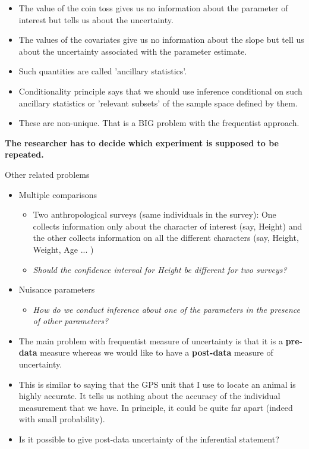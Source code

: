 \documentclass[10pt]{beamer}
\begin{document}
\begin{frame}
\begin{itemize}
\item The value of the coin toss gives us no information about the parameter of interest but tells us about the uncertainty.
\pause
\item The values of the covariates give us no information about the slope but tell us about the uncertainty associated with the parameter estimate.
\pause
\item Such quantities are called 'ancillary statistics'. 
\pause
\item Conditionality principle says that we should use inference conditional on such ancillary statistics or 'relevant subsets' of the sample space defined by them.
\pause
\item These are non-unique. That is a BIG problem with the frequentist approach. 
\end{itemize}
\alert {\textbf {The researcher has to decide which experiment is supposed to be repeated.}} 
\end{frame}

\begin{frame}

\LARGE Other related problems

\begin{itemize}
\item Multiple comparisons
\begin{itemize}
\item Two anthropological surveys (same individuals in the survey): One collects information only about the character of interest (say, Height) and the other collects information on all the different characters (say, Height, Weight, Age ... )
\item \textit{Should the confidence interval for Height be different for two surveys?}
\end{itemize}
\item Nuisance parameters
\begin{itemize}
\item \textit {How do we conduct inference about one of the parameters in the presence of other parameters?}
\end{itemize}
\end{itemize}
\end{frame}

\begin{frame}
\begin{itemize}
\pause
\item The main problem with frequentist measure of uncertainty is that it is a \textbf{pre-data} measure whereas we would like to have a \textbf{post-data} measure of uncertainty. 
\pause
\item This is similar to saying that the GPS unit that I use to locate an animal is highly accurate. It tells us nothing about the accuracy of the \alert{individual} measurement that we have. In principle, it could be quite far apart (indeed with small probability).
\pause
\item \alert {\large Is it possible to give post-data uncertainty of the inferential statement?} 
\end{itemize}
\end{frame}
\end{document}
